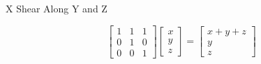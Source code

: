 \documentclass{beamer}
\begin{document}
\begin{frame}{X Shear Along Y and Z}

\[ \left[ \begin{array}{ccc} 1 & 1 & 1\\ 0 & 1 & 0 \\ 0 & 0 & 1 \end{array} \right] \left[ \begin{array}{c} x \\ y \\ z \end{array} \right] =  \left[ \begin{array}{c} x + y + z \\ y \\ z \end{array} \right] \]

\begin{figure}[t]
    \captionsetup[subfloat]{labelformat=empty}
	\centering

\end{figure}

\end{frame}
\end{document}

